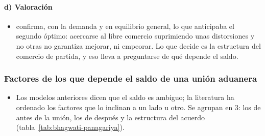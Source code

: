 \documentclass[11pt]{article}
\begin{document}
\paragraph{d) Valoración}

\begin{itemize}
\item {} confirma, con la demanda y en equilibrio general, lo que anticipaba el segundo óptimo: acercarse al libre comercio suprimiendo unas distorsiones y no otras no garantiza mejorar, ni empeorar. Lo que decide es la estructura del comercio de partida, y eso lleva a preguntarse de qué depende el saldo.
\end{itemize}

\subsubsection{Factores de los que depende el saldo de una unión aduanera}\label{sec:bhagwati-panagariya}

\begin{itemize}
\item Los modelos anteriores dicen que el saldo es ambiguo; la literatura ha ordenado los factores que lo inclinan a un lado u otro. Se agrupan en 3: los de antes de la unión, los de después y la estructura del acuerdo (tabla~\ref{tab:bhagwati-panagariya}).
\end{itemize}
\end{document}
